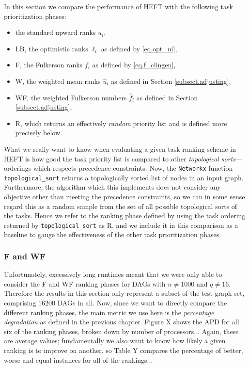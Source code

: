 \documentclass[12pt]{article}
\begin{document}
In this section we compare the performance of HEFT with the following task prioritization phases:
\begin{itemize}
	\item the standard upward ranks $u_i$,
	\item LB, the optimistic ranks $\ell_i$ as defined by \eqref{eq.opt_ui},
	\item F, the Fulkerson ranks $f_i$ as defined by \eqref{eq.f_clingen},
	\item W, the weighted mean ranks $\hat{u}_i$ as defined in Section \ref{subsect.adjusting},
	\item WF, the weighted Fulkerson numbers $\hat{f}_i$ as defined in Section \ref{subsect.adjusting},
        \item R, which returns an effectively {\em random} priority list and is defined more precisely below.
        \end{itemize}
        What we really want to know when evaluating a given task ranking scheme in HEFT is how good the task priority list is compared to other {\em topological sorts}---orderings which respects precedence constraints. Now, the {\tt Networkx} function {\tt topological\_sort} returns a topologically sorted list of nodes in an input graph. Furthermore, the algorithm which this implements does not consider any objective other than meeting the precedence constraints, so we can in some sense regard this as a random sample from the set of all possible topological sorts of the tasks. Hence we refer to the ranking phase defined by using the task ordering returned by {\tt topological\_sort} as R, and we include it in this comparison as a baseline to gauge the effectiveness of the other task prioritization phases.

        \subsubsection{F and WF}
        \label{subsubsect.f_and_wf}

Unfortunately, excessively long runtimes meant that we were only able to consider the F and WF ranking phases for DAGs with $n \neq 1000$ and $q \neq 16$. Therefore the results in this section only represent a subset of the test graph set, comprising $16200$ DAGs in all. Now, since we want to directly compare the different ranking phases, the main metric we use here is the {\em percentage degradation} as defined in the previous chapter. Figure X shows the APD for all six of the ranking phases, broken down by number of processors... Again, these are average values; fundamentally we also want to know how likely a given ranking is to improve on another, so Table Y compares the percentage of better, worse and equal instances for all of the rankings...       
        
\end{document}
